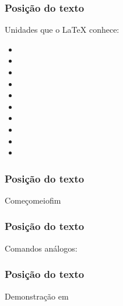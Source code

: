 \begin{frame}[fragile]
  \frametitle{Posição do texto}
  \LARGE
  Unidades que o \LaTeX{} conhece:

  \begin{multicols}{2}
    \begin{itemize}
      \item{}
      \item{}
      \item{}
      \item{}
      \item{}
      \item{}
      \item\latexcode{\textheight}
      \item\latexcode{\textwidth}
      \item\latexcode{\pageheight}
      \item\latexcode{\pagewidth}
    \end{itemize}
  \end{multicols}
\end{frame}

\begin{frame}[fragile]
  \frametitle{Posição do texto}
  \LARGE
  \vspace{1em}

  Começo\hfill meio\hfill fim
\end{frame}

\begin{frame}[fragile]
  \frametitle{Posição do texto}
  \LARGE
  Comandos análogos:

  \latexcode{\vspace{comprimento}}
  \vspace{1em}

  \latexcode{\vfill}
\end{frame}

\begin{frame}
  \frametitle{Posição do texto}
  \huge
  Demonstração em 
\end{frame}

